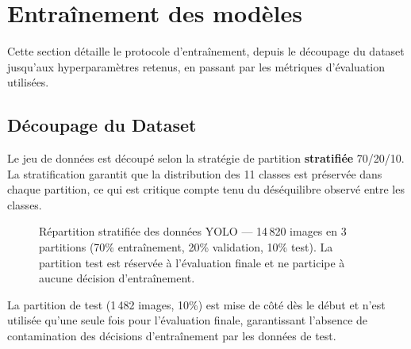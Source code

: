 \section{Entraînement des modèles}

Cette section détaille le protocole d'entraînement, depuis le découpage du dataset
jusqu'aux hyperparamètres retenus, en passant par les métriques d'évaluation utilisées.

\subsection{Découpage du Dataset}

Le jeu de données est découpé selon la stratégie de partition \textbf{stratifiée}
70/20/10. La stratification garantit que la distribution des 11 classes est
préservée dans chaque partition, ce qui est critique compte tenu du déséquilibre
observé entre les classes.

\begin{figure}[H]
\centering
{}%
\caption{Répartition stratifiée des données YOLO --- 14\,820 images en 3 partitions
(70\% entraînement, 20\% validation, 10\% test). La partition test est réservée
à l'évaluation finale et ne participe à aucune décision d'entraînement.}
\label{fig:data_split}
\end{figure}

La partition de test (1\,482 images, 10\%) est mise de côté dès le début et
n'est utilisée qu'une seule fois pour l'évaluation finale, garantissant l'absence
de contamination des décisions d'entraînement par les données de test.

